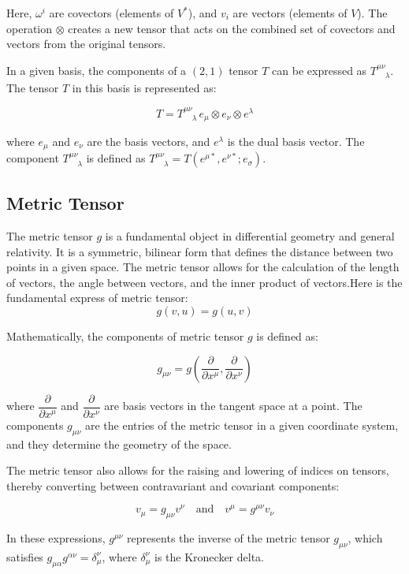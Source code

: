 \documentclass{article}
\begin{document}
Here, \( \omega^i \) are covectors (elements of \( V^* \)), and \( v_i \) are vectors (elements of \( V \)). The operation \( \otimes \) creates a new tensor that acts on the combined set of covectors and vectors from the original tensors.

In a given basis, the components of a \( (2,1) \) tensor \( T \) can be expressed as \( T^{\mu\nu}_{\phantom{\mu\nu}\lambda} \). The tensor \( T \) in this basis is represented as:

\[
T = T^{\mu\nu}_{\phantom{\mu\nu}\lambda} \, e_\mu \otimes e_\nu \otimes e^\lambda
\]

\noindent where \( e_\mu \) and \( e_\nu \) are the basis vectors, and \( e^\lambda \) is the dual basis vector. The component \( T^{\mu\nu}_{\phantom{\mu\nu}\lambda} \) is defined as \( T^{\mu\nu}_{\phantom{\mu\nu}\lambda} = T(e^{\mu*} , e^{\nu*} ; e_\sigma) \). 
\subsection{Metric Tensor}

The metric tensor \( g \) is a fundamental object in differential geometry and general relativity. It is a symmetric, bilinear form that defines the distance between two points in a given space. The metric tensor allows for the calculation of the length of vectors, the angle between vectors, and the inner product of vectors.Here is the fundamental express of metric tensor:
\[g(v,u)=g(u,v)
\]

Mathematically, the components of metric tensor \( g \) is defined as:

\[
g_{\mu\nu} = g\left(\frac{\partial}{\partial x^\mu}, \frac{\partial}{\partial x^\nu}\right)
\]

where \( \dfrac{\partial}{\partial x^\mu} \) and \( \dfrac{\partial}{\partial x^\nu} \) are basis vectors in the tangent space at a point. The components \( g_{\mu\nu} \) are the entries of the metric tensor in a given coordinate system, and they determine the geometry of the space.

The metric tensor also allows for the raising and lowering of indices on tensors, thereby converting between contravariant and covariant components:

\[
v_\mu = g_{\mu\nu} v^\nu
\quad \text{and} \quad
v^\mu = g^{\mu\nu} v_\nu
\]

In these expressions, \( g^{\mu\nu} \) represents the inverse of the metric tensor \( g_{\mu\nu} \), which satisfies \( g_{\mu\alpha} g^{\alpha\nu} = \delta^\nu_\mu \), where \( \delta^\nu_\mu \) is the Kronecker delta.
\end{document}
